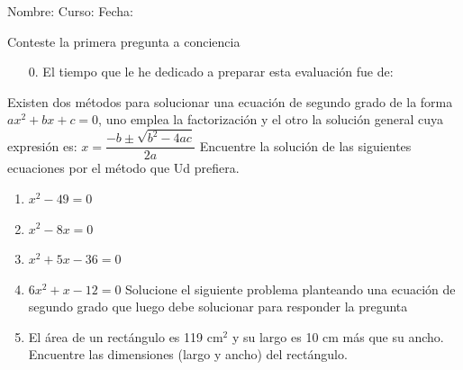 \documentclass[letterpaper,fleqn]{article}
\newcommand{\LineaNombre}{%
\par
\vspace{\baselineskip}
Nombre:\hrulefill \; Curso: \underline{\hspace*{48pt}} \; Fecha: \underline{\hspace*{2.5cm}} \relax
\par}
\begin{document}
\LineaNombre
\vspace*{12pt}

Conteste la primera pregunta a conciencia
\begin{enumerate}
 \item[0.] El tiempo que le he dedicado a preparar esta evaluación fue de:
 \end{enumerate}
 \vspace*{12pt}
 Existen dos métodos para solucionar una ecuación de segundo grado de la forma $ax^{2}+bx+c=0$, uno emplea la factorización y el otro la solución general cuya expresión es: 
$x=\dfrac{-b\pm \sqrt{b^{2}-4ac}}{2a}$
 Encuentre la solución de las siguientes ecuaciones por el método que Ud prefiera.
 \begin{enumerate}
 \item $x^{2}-49=0$ \noanswer
 \item $x^{2}-8x=0$ \noanswer
 \item $x^{2}+5x-36=0$ \noanswer
 \item $6x^{2}+x-12=0$\noanswer
 Solucione el siguiente problema planteando una ecuación de segundo grado que luego debe solucionar para responder la pregunta
 \item El área de un rectángulo es 119 cm$^{2}$ y su largo es 10 cm más que su ancho. Encuentre las dimensiones (largo y ancho) del rectángulo. \noanswer
 \end{enumerate}
\end{document}
